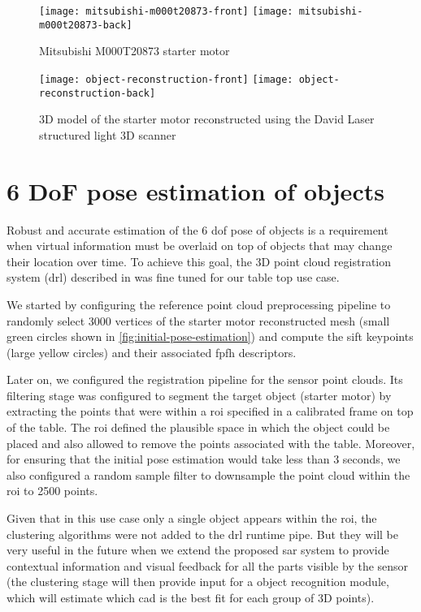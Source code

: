 \begin{figure}[!ht]
	\centering
	\texttt{[image: mitsubishi-m000t20873-front]}
	\texttt{[image: mitsubishi-m000t20873-back]}
	\caption{Mitsubishi M000T20873 starter motor}
	\label{fig:starter-motor}
\end{figure}

\begin{figure}[!ht]
	\centering
	\texttt{[image: object-reconstruction-front]}
	\texttt{[image: object-reconstruction-back]}
	\caption{3D model of the starter motor reconstructed using the David Laser structured light 3D scanner}
	\label{fig:object-reconstruction}
\end{figure}



\section{6 DoF pose estimation of objects}\label{sec:pose-estimation}

Robust and accurate estimation of the 6 \gls{dof} pose of objects is a requirement when virtual information must be overlaid on top of objects that may change their location over time. To achieve this goal, the 3D point cloud registration system (drl) described in \cite{Costa2016} was fine tuned for our table top use case.

We started by configuring the reference point cloud preprocessing pipeline to randomly select 3000 vertices of the starter motor reconstructed mesh (small green circles shown in \cref{fig:initial-pose-estimation}) and compute the \gls{sift} \cite{Lowe2004} keypoints (large yellow circles) and their associated \gls{fpfh} \cite{Rusu2009} descriptors.

Later on, we configured the registration pipeline for the sensor point clouds. Its filtering stage was configured to segment the target object (starter motor) by extracting the points that were within a \gls{roi} specified in a calibrated frame on top of the table. The \gls{roi} defined the plausible space in which the object could be placed and also allowed to remove the points associated with the table. Moreover, for ensuring that the initial pose estimation would take less than 3 seconds, we also configured a random sample filter to downsample the point cloud within the \gls{roi} to 2500 points.

Given that in this use case only a single object appears within the \gls{roi}, the clustering algorithms were not added to the drl runtime pipe. But they will be very useful in the future when we extend the proposed \gls{sar} system to provide contextual information and visual feedback for all the parts visible by the sensor (the clustering stage will then provide input for a object recognition module, which will estimate which \gls{cad} is the best fit for each group of 3D points).

